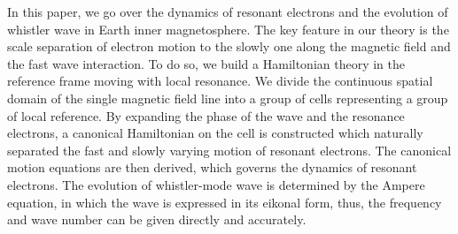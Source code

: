 In this paper, we go over the dynamics of resonant electrons and the evolution of whistler wave in Earth inner magnetosphere. The key feature in our theory is the scale separation of electron motion to the slowly one along the magnetic field and the fast wave interaction. 
To do so, we build a Hamiltonian theory in the reference frame moving with local resonance.
We divide the continuous spatial domain of the single magnetic field line into a group of cells representing a group of local reference.
By expanding the phase of the wave and the resonance electrons, a canonical Hamiltonian on the cell is constructed which naturally separated the fast and slowly varying motion of resonant electrons.
The canonical motion equations are then derived, which governs the dynamics of resonant electrons. 
The evolution of whistler-mode wave is determined by the Ampere equation, in which the wave is expressed in its eikonal form, thus, the frequency and wave number can be given directly and accurately.

